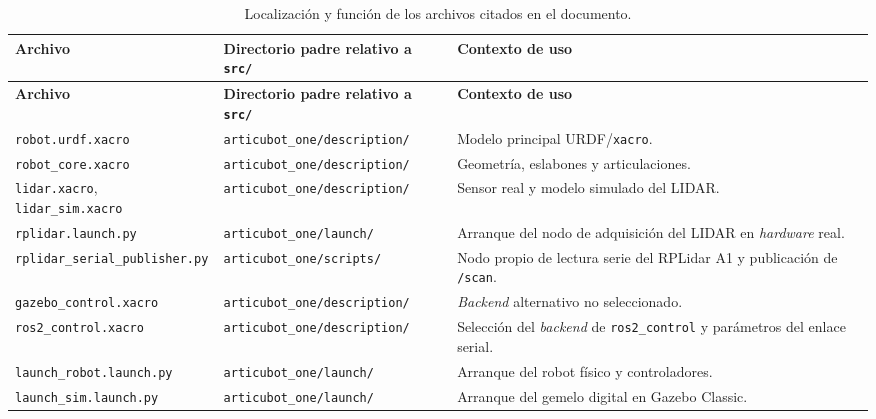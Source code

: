 \begin{appendices}
\begingroup
\small
\setlength{\tabcolsep}{4pt}
\begin{longtable}{p{4.5cm} p{4.0cm} p{5.0cm}}
\caption{Localización y función de los archivos citados en el documento.}
\label{tab:rutas_software}\\
\toprule
\textbf{Archivo} & \textbf{Directorio padre relativo a \texttt{src/}} & \textbf{Contexto de uso} \\
\midrule
\endfirsthead
\toprule
\textbf{Archivo} & \textbf{Directorio padre relativo a \texttt{src/}} & \textbf{Contexto de uso} \\
\midrule
\endhead
\bottomrule
\endfoot
\texttt{robot.\allowbreak{}urdf.\allowbreak{}xacro} & \texttt{articubot\_\allowbreak{}one/\allowbreak{}description/} & Modelo principal URDF/\texttt{xacro}. \\
\texttt{robot\_\allowbreak{}core.\allowbreak{}xacro} & \texttt{articubot\_\allowbreak{}one/\allowbreak{}description/} & Geometría, eslabones y articulaciones. \\
\texttt{lidar.\allowbreak{}xacro}, \texttt{lidar\_\allowbreak{}sim.\allowbreak{}xacro} & \texttt{articubot\_\allowbreak{}one/\allowbreak{}description/} & Sensor real y modelo simulado del LIDAR. \\
\texttt{rplidar.\allowbreak{}launch.\allowbreak{}py} & \texttt{articubot\_\allowbreak{}one/\allowbreak{}launch/} & Arranque del nodo de adquisición del LIDAR en \textit{hardware} real. \\
\texttt{rplidar\_\allowbreak{}serial\_\allowbreak{}publisher.\allowbreak{}py} & \texttt{articubot\_\allowbreak{}one/\allowbreak{}scripts/} & Nodo propio de lectura serie del RPLidar A1 y publicación de \texttt{/scan}. \\
\texttt{gazebo\_\allowbreak{}control.\allowbreak{}xacro} & \texttt{articubot\_\allowbreak{}one/\allowbreak{}description/} & \textit{Backend} alternativo no seleccionado. \\
\texttt{ros2\_\allowbreak{}control.\allowbreak{}xacro} & \texttt{articubot\_\allowbreak{}one/\allowbreak{}description/} & Selección del \textit{backend} de \texttt{ros2\_control} y parámetros del enlace serial. \\
\texttt{launch\_\allowbreak{}robot.\allowbreak{}launch.\allowbreak{}py} & \texttt{articubot\_\allowbreak{}one/\allowbreak{}launch/} & Arranque del robot físico y controladores. \\
\texttt{launch\_\allowbreak{}sim.\allowbreak{}launch.\allowbreak{}py} & \texttt{articubot\_\allowbreak{}one/\allowbreak{}launch/} & Arranque del gemelo digital en Gazebo Classic. \\

\end{longtable}
\end{appendices}
